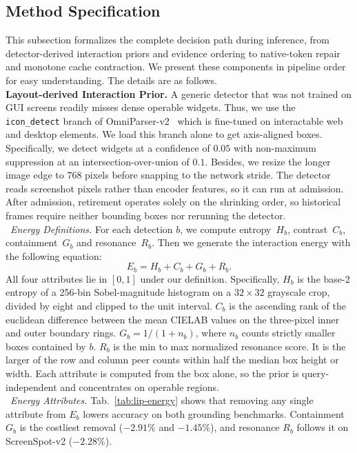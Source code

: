 \subsection{Method Specification}
This subsection formalizes the complete decision path during inference, from detector-derived interaction priors and evidence ordering to native-token repair and monotone cache contraction.
%
We present these components in pipeline order for easy understanding.
%
The details are as follows.
\\
\noindent\textbf{Layout-derived Interaction Prior.}
A generic detector that was not trained on GUI screens readily misses dense operable widgets.
%
Thus, we use the \texttt{icon\_detect} branch of OmniParser-v2~\citep{lu2024omniparser} which is fine-tuned on interactable web and desktop elements.
%
We load this branch alone to get axis-aligned boxes.
%
Specifically, we detect widgets at a confidence of $0.05$ with non-maximum suppression at an intersection-over-union of $0.1$.
%
Besides, we resize the longer image edge to $768$ pixels before snapping to the network stride.
%
The detector reads screenshot pixels rather than encoder features, so it can run at admission.
%
After admission, retirement operates solely on the shrinking order, so historical frames require neither bounding boxes nor rerunning the detector.
\\
\noindent{}~\textit{Energy Definitions.}
For each detection $b$, we compute entropy~$H_b$, contrast~$C_b$, containment~$G_b$ and resonance~$R_b$.
%
Then we generate the interaction energy with the following equation:
\[
E_b=H_b+C_b+G_b+R_b.
\]
All four attributes lie in $[0,1]$ under our definition.
%
Specifically, $H_b$ is the base-2 entropy of a 256-bin Sobel-magnitude histogram on a $32\times32$ grayscale crop, divided by eight and clipped to the unit interval.
%
$C_b$ is the ascending rank of the euclidean difference between the mean CIELAB values on the three-pixel inner and outer boundary rings.
%
$G_b=1/(1+n_b)$, where $n_b$ counts strictly smaller boxes contained by $b$.
%
$R_b$ is the min to max normalized resonance score. It is the larger of the row and column peer counts within half the median box height or width.
%
Each attribute is computed from the box alone, so the prior is query-independent and concentrates on operable regions.
\\
\noindent{}~\textit{Energy Attributes.}
Tab.~\ref{tab:lip-energy} shows that removing any single attribute from $E_b$ lowers accuracy on both grounding benchmarks.
%
Containment $G_b$ is the costliest removal ($-2.91\%$ and $-1.45\%$), and resonance $R_b$ follows it on ScreenSpot-v2 ($-2.28\%$).

